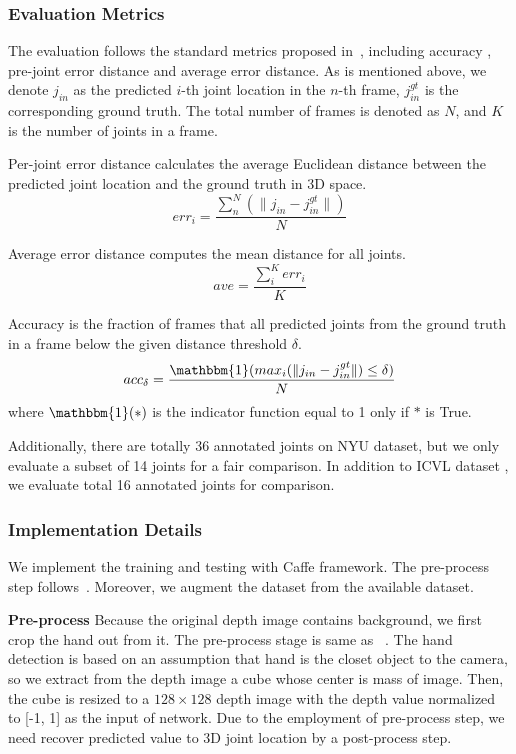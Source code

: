 \documentclass[journal,comsoc]{IEEEtran}
\begin{document}
\subsubsection{Evaluation Metrics}\label{sec:evaluation metrics}
The evaluation follows the standard metrics proposed in~\cite{oberweger2015hands}, including accuracy
, pre-joint error distance and average error distance. As is mentioned above, we denote $j_{in}$ as
the predicted $i$-th joint location in the $n$-th frame, $j_{in}^{gt}$ is the corresponding ground
truth. The total number of frames is denoted as $N$, and $K$ is the number of joints in a frame.

Per-joint error distance calculates the average Euclidean distance between the predicted
joint location and the ground truth in 3D space.
\begin{equation}
err_i = \frac{\sum_n^N(\|j_{in} - j_{in}^{gt} \|)}{N}
\end{equation}

Average error distance computes the mean distance for all joints.
\begin{equation}
ave = \frac{\sum_i^K{err_i}}{K}
\end{equation}

Accuracy is the fraction of frames that all predicted joints from the ground truth in a
frame below the given distance threshold $\delta$.
\begin{equation}
acc_{\delta} = \frac{\mathbbm{1}(max_i(\| j_{in} - j_{in}^{gt}\|) \leq \delta)}{N}
\end{equation}
where $\mathbbm{1}(*)$ is the indicator function equal to 1 only if $*$ is True.

Additionally, there are totally 36 annotated joints on NYU dataset, but we only
evaluate a subset of 14 joints for a fair comparison. In addition to ICVL dataset
, we evaluate total 16 annotated joints for comparison.

\subsubsection{Implementation Details}\label{sec:implementation}
We implement the training and testing with Caffe\cite{jia2014caffe} framework. The pre-process step
follows~\cite{oberweger2015hands}. Moreover, we augment the dataset from the available dataset.

\textbf{Pre-process}
Because the original depth image contains background, we first crop the hand out from it. The pre-process 
stage is same as ~\cite{oberweger2015hands}. The hand detection is based on an assumption that hand is the 
closet object to the camera, so we extract from the depth image a cube whose center is mass of image. Then, 
the cube is resized to a $128 \times 128$ depth image with the depth value normalized to [-1, 1] as the input 
of network. Due to the employment of pre-process step, we need recover predicted value to 3D joint location 
by a post-process step.
\end{document}

